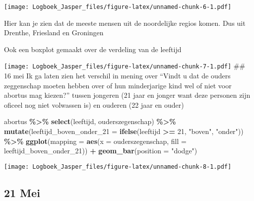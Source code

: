 \documentclass[
]{article}
\newenvironment{Shaded}{\begin{snugshade}}{\end{snugshade}}
\newcommand{\AttributeTok}[1]{\textcolor[rgb]{0.13,0.29,0.53}{#1}}
\newcommand{\DecValTok}[1]{\textcolor[rgb]{0.00,0.00,0.81}{#1}}
\newcommand{\FunctionTok}[1]{\textcolor[rgb]{0.13,0.29,0.53}{\textbf{#1}}}
\newcommand{\NormalTok}[1]{#1}
\newcommand{\SpecialCharTok}[1]{\textcolor[rgb]{0.81,0.36,0.00}{\textbf{#1}}}
\newcommand{\StringTok}[1]{\textcolor[rgb]{0.31,0.60,0.02}{#1}}
\begin{document}
\texttt{[image: Logboek\_Jasper\_files/figure-latex/unnamed-chunk-6-1.pdf]}

Hier kan je zien dat de meeste mensen uit de noordelijke regios komen.
\n Dus uit Drenthe, Friesland en Groningen \n

Ook een boxplot gemaakt over de verdeling van de leeftijd

\begin{Shaded}
\end{Shaded}

\texttt{[image: Logboek\_Jasper\_files/figure-latex/unnamed-chunk-7-1.pdf]}
\#\# 16 mei Ik ga laten zien het verschil in mening over ``Vindt u dat
de ouders zeggenschap moeten hebben over of hun minderjarige kind wel of
niet voor abortus mag kiezen?'' tussen jongeren (21 jaar en jonger want
deze personen zijn oficeel nog niet volwassen is) en ouderen (22 jaar en
ouder)

\begin{Shaded}
\begin{Highlighting}[]
\NormalTok{abortus }\SpecialCharTok{\%\textgreater{}\%}
    \FunctionTok{select}\NormalTok{(leeftijd, ouderszegenschap) }\SpecialCharTok{\%\textgreater{}\%}
    \FunctionTok{mutate}\NormalTok{(}\AttributeTok{leeftijd\_boven\_onder\_21 =} \FunctionTok{ifelse}\NormalTok{(leeftijd }\SpecialCharTok{\textgreater{}=} \DecValTok{21}\NormalTok{, }\StringTok{"boven"}\NormalTok{, }\StringTok{"onder"}\NormalTok{)) }\SpecialCharTok{\%\textgreater{}\%}
    \FunctionTok{ggplot}\NormalTok{(}\AttributeTok{mapping =} \FunctionTok{aes}\NormalTok{(}\AttributeTok{x =}\NormalTok{ ouderszegenschap, }\AttributeTok{fill =}\NormalTok{ leeftijd\_boven\_onder\_21)) }\SpecialCharTok{+}
    \FunctionTok{geom\_bar}\NormalTok{(}\AttributeTok{position =} \StringTok{"dodge"}\NormalTok{)}
\end{Highlighting}
\end{Shaded}

\texttt{[image: Logboek\_Jasper\_files/figure-latex/unnamed-chunk-8-1.pdf]}

\subsection{21 Mei}\label{mei-2}
\end{document}
